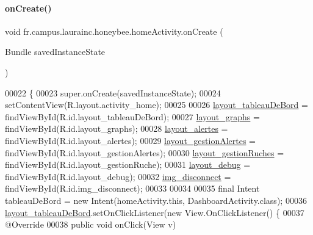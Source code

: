 \paragraph{\texorpdfstring{on\+Create()}{onCreate()}}
{\footnotesize\ttfamily void fr.\+campus.\+laurainc.\+honeybee.\+home\+Activity.\+on\+Create (\begin{DoxyParamCaption}\item[{Bundle}]{saved\+Instance\+State }\end{DoxyParamCaption})\hspace{0.3cm}{\ttfamily [protected]}}


\begin{DoxyCode}
00022                                                        \{
00023         super.onCreate(savedInstanceState);
00024         setContentView(R.layout.activity\_home);
00025 
00026         \hyperlink{classfr_1_1campus_1_1laurainc_1_1honeybee_1_1home_activity_add46240b2690229c03b49cffa3ba76bb}{layout\_tableauDeBord} = findViewById(R.id.layout\_tableauDeBord);
00027         \hyperlink{classfr_1_1campus_1_1laurainc_1_1honeybee_1_1home_activity_acb650487a892f3446ae3f58ef01733b7}{layout\_graphs} = findViewById(R.id.layout\_graphs);
00028         \hyperlink{classfr_1_1campus_1_1laurainc_1_1honeybee_1_1home_activity_aee95283002ad6087e895fa0fa51c5030}{layout\_alertes} = findViewById(R.id.layout\_alertes);
00029         \hyperlink{classfr_1_1campus_1_1laurainc_1_1honeybee_1_1home_activity_a6502d793c6b5c6df0c3b051b2bacab9b}{layout\_gestionAlertes} = findViewById(R.id.layout\_gestionAlertes);
00030         \hyperlink{classfr_1_1campus_1_1laurainc_1_1honeybee_1_1home_activity_aea8efb6a37f29b1a122844dcd3e26c0b}{layout\_gestionRuches} = findViewById(R.id.layout\_gestionRuche);
00031         \hyperlink{classfr_1_1campus_1_1laurainc_1_1honeybee_1_1home_activity_a513adcf5f7471faf27a0e7a2798caf56}{layout\_debug} = findViewById(R.id.layout\_debug);
00032         \hyperlink{classfr_1_1campus_1_1laurainc_1_1honeybee_1_1home_activity_ae29a1e0dd983c9e9f5554d37d6fc763e}{img\_disconnect} = findViewById(R.id.img\_disconnect);
00033 
00034 
00035         \textcolor{keyword}{final} Intent tableauDeBord = \textcolor{keyword}{new} Intent(homeActivity.this, DashboardActivity.class);
00036         \hyperlink{classfr_1_1campus_1_1laurainc_1_1honeybee_1_1home_activity_add46240b2690229c03b49cffa3ba76bb}{layout\_tableauDeBord}.setOnClickListener(\textcolor{keyword}{new} View.OnClickListener() \{
00037             @Override
00038             \textcolor{keyword}{public} \textcolor{keywordtype}{void} onClick(View v)

\end{DoxyCode}

